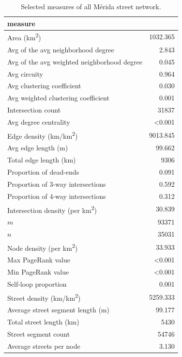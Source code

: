 \begin{table}[htbp]
	\centering
	\caption{Selected measures of all Mérida street network.}
	\label{tab:measures_urban_city}
	\small
	\begin{tabular}{ l r }
		\toprule
		measure                                          &              \\
		\midrule
		Area (km\textsuperscript{2})                     & 1032.365       \\
		Avg of the avg neighborhood degree               & 2.843        \\
		Avg of the avg weighted neighborhood degree      & 0.045       \\
		Avg circuity                                     & 0.964 \\
		Avg clustering coefficient                       & 0.030        \\
		Avg weighted clustering coefficient              & 0.001 \\
		Intersection count                               & 31837      \\
		Avg degree centrality                            & \textless0.001          \\
		Edge density (km/km\textsuperscript{2})          & 9013.845         \\
		Avg edge length (m)                              & 99.662          \\
		Total edge length (km)                           & 9306      \\
		Proportion of dead-ends                          & 0.091          \\
		Proportion of 3-way intersections                & 0.592         \\
		Proportion of 4-way intersections                & 0.312          \\
		Intersection density (per km\textsuperscript{2}) & 30.839          \\
		$m$                                              & 93371     \\
		$n$                                              & 35031      \\
		Node density (per km\textsuperscript{2})         & 33.933         \\
		Max PageRank value                               & \textless0.001 \\
		Min PageRank value                               & \textless0.001 \\
		Self-loop proportion                             & 0.001        \\
		Street density (km/km\textsuperscript{2})        & 5259.333        \\
		Average street segment length (m)                & 99.177        \\
		Total street length (km)                         & 5430     \\
		Street segment count                             & 54746      \\
		Average streets per node                         & 3.130         \\
		\bottomrule
	\end{tabular}
\end{table}

